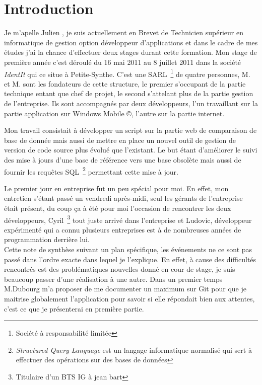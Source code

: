 \chapter{Introduction}

Je m'apelle Julien , je suis actuellement en Brevet de Technicien
supérieur en informatique de gestion option développeur d'applications et dans
le cadre de mes études j'ai la chance d'effectuer deux stages durant cette
formation. Mon stage de première année c'est déroulé du 16 mai 2011 au 8
juillet 2011 dans la société \emph{IdentIt} qui ce situe à Petite-Synthe. C'est
une SARL\, \footnote{Société à responsabilité limitée} de quatre personnes,
M. et M. sont les fondateurs de cette structure, le
premier s'occupant de la partie technique entant que chef de projet, le
second s'attelant plus de la partie gestion de l'entreprise. Ils sont
accompagnés par deux développeurs, l'un travaillant sur la partie application
sur Windows Mobile \copyright, l'autre sur la partie internet.

Mon travail consistait à développer un script sur la partie web de comparaison
de base de donnée mais aussi de mettre en place un nouvel outil de gestion de
version de code source plus évolué que l'existant. Le but étant d'améliorer le
suivi des mise à jours d'une base de référence vers une base obsolète mais
aussi de fournir les requêtes SQL\, \footnote{\emph{Structured Query Language}
est un langage informatique normalisé qui sert à effectuer des opérations sur
des bases de données} permettant cette mise à jour.

Le premier jour en entreprise fut un peu spécial pour moi. En effet, mon
entretien s'étant passé un vendredi après-midi, seul les gérants de
l'entreprise était présent, du coup ça à été pour moi l'occasion de rencontrer
les deux développeurs, Cyril\, \footnote{Titulaire d'un BTS IG à jean bart}
tout juste arrivé dans l'entreprise et Ludovic, développeur expérimenté qui a
connu plusieurs entreprises est à de nombreuses années de programmation
derrière lui.\\ Cette note de synthèse suivant un plan spécifique, les
événements ne ce sont pas passé dans l'ordre exacte dans lequel je l'explique.
En effet, à cause des difficultés rencontrés est des problématiques nouvelles
donné en cour de stage, je suis beaucoup passer d'une réalisation à une autre.
Dans un premier temps M.Dubourg m'a proposer de me documenter un maximum sur
Git pour que je maitrise globalement l'application pour savoir si elle
répondait bien aux attentes, c'est ce que je présenterai en première partie.

\clearpage
